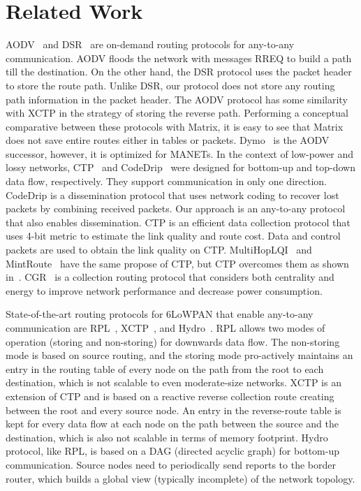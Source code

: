 \section{Related Work}
\label{sec:related}

AODV~\cite{AODV} and DSR~\cite{DSR} are on-demand routing protocols for any-to-any communication. AODV floods the network with messages RREQ to build a path till the destination. On the other hand, the DSR protocol uses the packet header to store the route path. Unlike DSR, our protocol does not store any routing path information in the packet header. The AODV protocol has some similarity with XCTP in the strategy of storing the reverse path. Performing a conceptual comparative between these protocols with Matrix, it is easy to see that Matrix does not save entire routes either in tables or packets. Dymo~\cite{dymo} is the AODV successor, however, it is optimized for MANETs. In the context of low-power and lossy networks, CTP~\cite{Fonseca:2009} and CodeDrip~\cite{junior2014codedrip} were designed for bottom-up and top-down data flow, respectively. They support communication in only one direction. CodeDrip is a dissemination protocol that uses network coding to recover lost packets by combining received packets. Our approach is an any-to-any protocol that also enables dissemination. CTP is an efficient data collection protocol that uses 4-bit \cite{fonseca2007four} metric to estimate the link quality and route cost. Data and control packets are used to obtain the link quality on CTP. MultiHopLQI~\cite{MultiHopLQI} and MintRoute~\cite{mintroute} have the same propose of CTP, but CTP overcomes them as shown in~\cite{Fonseca:2009}. CGR~\cite{Santos2017} is a collection routing protocol that considers both centrality and energy to improve network performance and decrease power consumption.

State-of-the-art routing protocols for 6LoWPAN that enable any-to-any communication are RPL~\cite{rfc6550}, XCTP~\cite{xctp}, and Hydro~\cite{hydro}. RPL allows two modes of operation (storing and non-storing) for downwards data flow. The non-storing mode is based on source routing, and the storing mode pro-actively maintains an entry in the routing table of every node on the path from the root to each destination, which is not scalable to even moderate-size networks. XCTP is an extension of CTP and is based on a reactive reverse collection route creating between the root and every source node. An entry in the reverse-route table is kept for every data flow at each node on the path between the source and the destination, which is also not scalable in terms of memory footprint. Hydro protocol, like RPL, is based on a DAG (directed acyclic graph) for bottom-up communication. Source nodes need to periodically send reports to the border router, which builds a global view (typically incomplete) of the network topology. 

